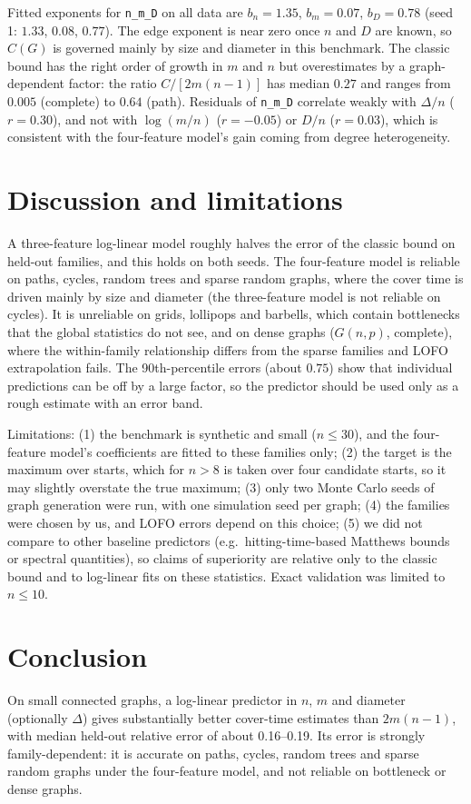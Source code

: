 \documentclass[10pt]{article}
\begin{document}
Fitted exponents for \texttt{n\_m\_D} on all data are $b_n=1.35$, $b_m=0.07$, $b_D=0.78$
(seed 1: $1.33$, $0.08$, $0.77$). The edge exponent is near zero once $n$ and $D$ are known,
so $C(G)$ is governed mainly by size and diameter in this benchmark. The classic bound
has the right order of growth in $m$ and $n$ but overestimates by a graph-dependent factor:
the ratio $C/[2m(n-1)]$ has median $0.27$ and ranges from $0.005$ (complete) to $0.64$ (path).
Residuals of \texttt{n\_m\_D} correlate weakly with $\Delta/n$ ($r=0.30$), and not with
$\log(m/n)$ ($r=-0.05$) or $D/n$ ($r=0.03$), which is consistent with the four-feature
model's gain coming from degree heterogeneity.

\section{Discussion and limitations}
A three-feature log-linear model roughly halves the error of the classic bound on
held-out families, and this holds on both seeds. The four-feature model is reliable on paths, cycles, random trees and sparse random graphs, where
the cover time is driven mainly by size and diameter (the three-feature model is not reliable on cycles).
It is unreliable on grids, lollipops and barbells, which contain bottlenecks that the global
statistics do not see, and on dense graphs ($G(n,p)$, complete), where the within-family
relationship differs from the sparse families and LOFO extrapolation fails. The 90th-percentile
errors (about $0.75$) show that individual predictions can be off by a large factor, so the predictor
should be used only as a rough estimate with an error band.

Limitations: (1) the benchmark is synthetic and small ($n\le 30$), and the four-feature model's
coefficients are fitted to these families only; (2) the target is the maximum over starts, which
for $n>8$ is taken over four candidate starts, so it may slightly overstate the true maximum;
(3) only two Monte Carlo seeds of graph generation were run, with one simulation seed per
graph; (4) the families were chosen by us, and LOFO errors depend on this choice; (5) we did not
compare to other baseline predictors (e.g.\ hitting-time-based Matthews bounds or spectral
quantities), so claims of superiority are relative only to the classic bound and to
log-linear fits on these statistics. Exact validation was limited to $n\le 10$.

\section{Conclusion}
On small connected graphs, a log-linear predictor in $n$, $m$ and diameter (optionally
$\Delta$) gives substantially better cover-time estimates than $2m(n-1)$, with median
held-out relative error of about 0.16--0.19. Its error is strongly family-dependent: it is
accurate on paths, cycles, random trees and sparse random graphs under the four-feature model,
and not reliable on bottleneck or dense graphs.
\end{document}
